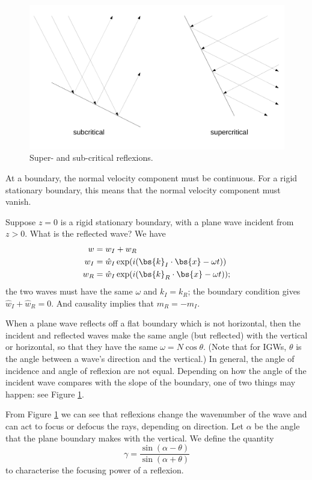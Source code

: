 \begin{figure}
\begin{center}
	\includegraphics[width=14cm]{super-and-sub-critical.pdf}
	\caption{Super- and sub-critical reflexions.}
	\label{fig:supersubcrit}
\end{center}
\end{figure}


At a boundary, the normal velocity component must be continuous. For a rigid stationary boundary, this means that the normal velocity component must vanish.

Suppose $z=0$ is a rigid stationary boundary, with a plane wave incident from $z>0$. What is the reflected wave? We have 
\begin{align}
	w &= w_I + w_R \\
	w_I &= \hat{w}_I \exp(i(\bs{k}_I\cdot\bs{x} - \omega t)) \\
	w_R &= \hat{w}_I \exp(i(\bs{k}_R\cdot\bs{x} - \omega t));
\end{align}
the two waves must have the same $\omega$ and $k_I = k_R$; the boundary condition gives $\hat{w}_I + \hat{w}_R = 0$. And causality implies that $m_R = -m_I$. 

When a plane wave reflects off a flat boundary which is not horizontal, then the incident and reflected waves make the same angle (but reflected) with the vertical or horizontal, so that they have the same $\omega = N\cos\theta$. (Note that for IGWs, $\theta$ is the angle between a wave's direction and the vertical.) In general, the angle of incidence and angle of reflexion are not equal. Depending on how the angle of the incident wave compares with the slope of the boundary, one of two things may happen: see Figure \ref{fig:supersubcrit}. 

From Figure \ref{fig:supersubcrit} we can see that reflexions change the wavenumber of the wave and can act to focus or defocus the rays, depending on direction. Let $\alpha$ be the angle that the plane boundary makes with the vertical. We define the quantity 
\begin{equation}
	\gamma  =  \frac{\sin(\alpha-\theta)}{\sin(\alpha+\theta)}
\end{equation}
to characterise the focusing power of a reflexion. 

